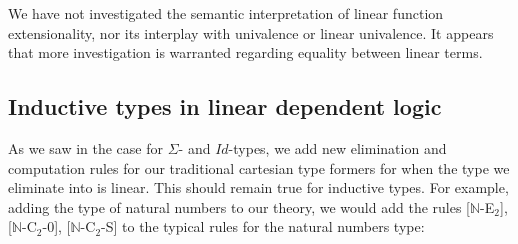   We have not investigated the semantic interpretation of linear function extensionality, nor its interplay with univalence or linear univalence. It appears that more investigation is warranted regarding equality between linear terms.
  \subsection{Inductive types in linear dependent logic}
  As we saw in the case for $\Sigma$- and $Id$-types, we add new elimination and computation rules for our traditional cartesian type formers for when the type we eliminate into is linear. This should remain true for inductive types. For example, adding the type of natural numbers to our theory, we would add the rules [$\mathbb{N}$-E$_2$], [$\mathbb{N}$-C$_2$-0], [$\mathbb{N}$-C$_2$-S] to the typical rules for the natural numbers type:\\
